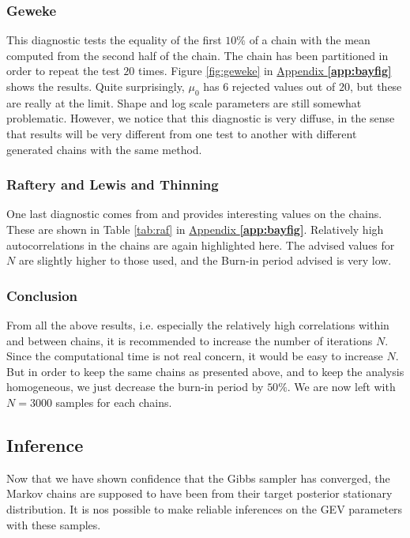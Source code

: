 \subsubsection*{Geweke}

This diagnostic tests the equality of the first $10\%$ of a chain with the mean computed from the second half of the chain. The chain has been partitioned in order to repeat the test $20$ times.
Figure \ref{fig:geweke} in \hyperref[app:bayfig]{Appendix \textbf{\ref{app:bayfig}}} shows the results. Quite surprisingly, $\mu_0$ has $6$ rejected values out of $20$, but these are really at the limit. Shape and log scale parameters are still somewhat problematic. However, we notice that this diagnostic is very diffuse, in the sense that results will be very different from one test to another with different generated chains with the same method.


\subsubsection*{Raftery and Lewis and Thinning}

One last diagnostic comes from \citet{raftery1992} and provides interesting values on the chains. These are shown in Table \ref{tab:raf} in \hyperref[app:bayfig]{Appendix \textbf{\ref{app:bayfig}}}.
Relatively high autocorrelations in the chains are again highlighted here. The advised values for $N$ are slightly higher to those used, and the Burn-in period advised is very low.  



\subsubsection*{Conclusion}

From all the above results, i.e. especially the relatively high correlations within and between chains, it is recommended to increase the number of iterations $N$. Since the computational time is not real concern, it would be easy to increase $N$. But in order to keep the same chains as presented above, and to keep the analysis homogeneous, we just decrease the burn-in period by $50\%$. We are now left with $N=3000$ samples for each chains. 


\subsection{Inference}\label{sec:bayinfci}

Now that we have shown confidence that the Gibbs sampler has converged, the Markov chains are supposed to have been from their target posterior stationary distribution. It is nos possible to make reliable inferences on the GEV parameters with these samples.

